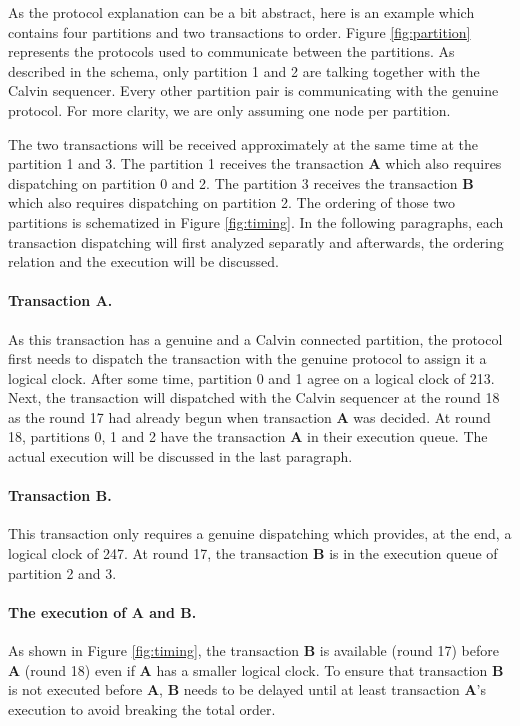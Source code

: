 \documentclass[a4paper, 10pt]{article}
\begin{document}
As the protocol explanation can be a bit abstract, here is an example which contains four partitions and two transactions
to order. Figure \ref{fig:partition} represents the protocols used to communicate between the partitions. As described
in the schema, only partition 1 and 2 are talking together with the Calvin sequencer. Every other partition pair is communicating
with the genuine protocol. For more clarity, we are only assuming one node per partition.

The two transactions will be received approximately at the same time at the partition 1 and 3. The partition 1 receives the
transaction \textbf{A} which also requires dispatching on partition 0 and 2. The partition 3 receives the transaction \textbf{B} which
also requires dispatching on partition 2. The ordering of those two partitions is schematized in Figure \ref{fig:timing}.
In the following paragraphs, each transaction dispatching will first analyzed separatly and afterwards, the ordering relation
and the execution will be discussed.

\paragraph{Transaction A.} As this transaction has a genuine and a Calvin connected partition, the protocol first needs to dispatch
    the transaction with the genuine protocol to assign it a logical clock. After some time, partition 0 and 1 agree on a logical clock
    of 213. Next, the transaction will dispatched with the Calvin sequencer at the round 18 as the round 17 had already begun when
    transaction \textbf{A} was decided. At round 18, partitions 0, 1 and 2 have the transaction \textbf{A} in their execution queue.
    The actual execution will be discussed in the last paragraph.

\paragraph{Transaction B.} This transaction only requires a genuine dispatching which provides, at the end, a logical clock
    of 247. At round 17, the transaction \textbf{B} is in the execution queue of partition 2 and 3.

\paragraph{The execution of A and B.} As shown in Figure \ref{fig:timing}, the transaction \textbf{B} is available (round 17)
    before \textbf{A} (round 18) even if \textbf{A} has a smaller logical clock. To ensure that transaction \textbf{B} is
    not executed before \textbf{A}, \textbf{B} needs to be delayed until at least transaction \textbf{A}'s execution to avoid breaking
    the total order.
\end{document}
